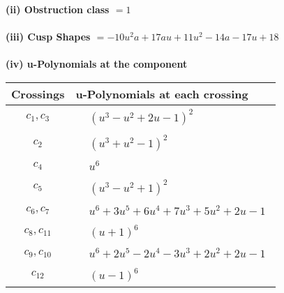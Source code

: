 \documentclass[1p]{elsarticle_modified}
\theoremstyle{definition}
\begin{document}
\flushleft \textbf{(ii) Obstruction class $= 1$}\\~\\
\flushleft \textbf{(iii) Cusp Shapes $= -10 u^2 a+17 a u+11 u^2-14 a-17 u+18$}\\~\\
\newpage\renewcommand{\arraystretch}{1}
\flushleft \textbf{(iv) u-Polynomials at the component}\newline \\
\begin{tabular}{m{50pt}|m{274pt}}
Crossings & \hspace{64pt}u-Polynomials at each crossing \\
\hline $$\begin{aligned}c_{1},c_{3}\end{aligned}$$&$\begin{aligned}
&(u^3- u^2+2 u-1)^2
\end{aligned}$\\
\hline $$\begin{aligned}c_{2}\end{aligned}$$&$\begin{aligned}
&(u^3+u^2-1)^2
\end{aligned}$\\
\hline $$\begin{aligned}c_{4}\end{aligned}$$&$\begin{aligned}
&u^6
\end{aligned}$\\
\hline $$\begin{aligned}c_{5}\end{aligned}$$&$\begin{aligned}
&(u^3- u^2+1)^2
\end{aligned}$\\
\hline $$\begin{aligned}c_{6},c_{7}\end{aligned}$$&$\begin{aligned}
&u^6+3 u^5+6 u^4+7 u^3+5 u^2+2 u-1
\end{aligned}$\\
\hline $$\begin{aligned}c_{8},c_{11}\end{aligned}$$&$\begin{aligned}
&(u+1)^6
\end{aligned}$\\
\hline $$\begin{aligned}c_{9},c_{10}\end{aligned}$$&$\begin{aligned}
&u^6+2 u^5-2 u^4-3 u^3+2 u^2+2 u-1
\end{aligned}$\\
\hline $$\begin{aligned}c_{12}\end{aligned}$$&$\begin{aligned}
&(u-1)^6
\end{aligned}$\\
\hline
\end{tabular}\\~\\
\end{document}
